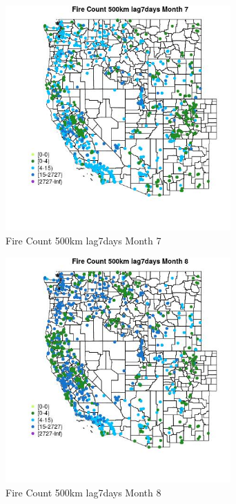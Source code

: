 \begin{figure} 
\centering  
\includegraphics[width=0.77\textwidth]{Code_Outputs/Report_ML_input_PM25_Step4_part_f_de_duplicated_aves_prioritize_24hr_obswNAs_MapObsMo7Fire_Count_500km_lag7days.jpg} 
\caption{\label{fig:Report_ML_input_PM25_Step4_part_f_de_duplicated_aves_prioritize_24hr_obswNAsMapObsMo7Fire_Count_500km_lag7days}Fire Count 500km lag7days Month 7} 
\end{figure} 
 

\begin{figure} 
\centering  
\includegraphics[width=0.77\textwidth]{Code_Outputs/Report_ML_input_PM25_Step4_part_f_de_duplicated_aves_prioritize_24hr_obswNAs_MapObsMo8Fire_Count_500km_lag7days.jpg} 
\caption{\label{fig:Report_ML_input_PM25_Step4_part_f_de_duplicated_aves_prioritize_24hr_obswNAsMapObsMo8Fire_Count_500km_lag7days}Fire Count 500km lag7days Month 8} 
\end{figure} 
 

